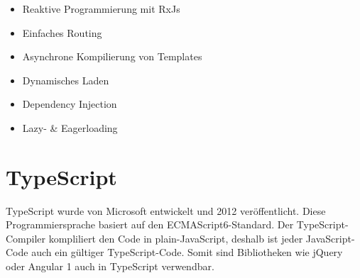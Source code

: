 \begin{itemize}
	\item Reaktive Programmierung mit RxJs
	\item Einfaches Routing
	\item Asynchrone Kompilierung von Templates
	\item Dynamisches Laden
	\item Dependency Injection
	\item Lazy- \& Eagerloading
\end{itemize}

\section{TypeScript}
TypeScript wurde von Microsoft entwickelt und 2012 veröffentlicht. Diese Programmiersprache basiert auf den ECMAScript6-Standard. Der TypeScript-Compiler kompliliert den Code in plain-JavaScript, deshalb ist jeder JavaScript-Code auch ein gültiger TypeScript-Code. Somit sind Bibliotheken wie jQuery oder Angular 1 auch in TypeScript verwendbar. \autocite{wikiTypeScript} \\

